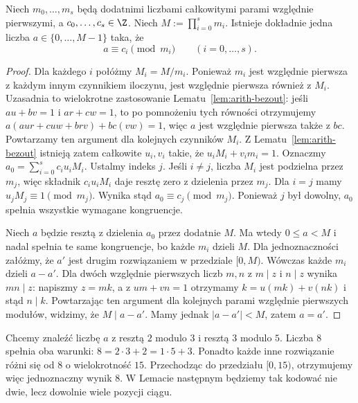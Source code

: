 \begin{twierdzenie}\label{thm:arith-crt}
Niech $m_0,\ldots,m_s$ będą dodatnimi liczbami całkowitymi
parami względnie pierwszymi, a $c_0,\ldots,c_s\in\Z$.
Niech $M:=\prod_{i=0}^s m_i$. Istnieje dokładnie jedna
liczba $a\in\{0,\ldots,M-1\}$ taka, że
\[
a\equiv c_i\pmod{m_i}\qquad(i=0,\ldots,s).
\]
\end{twierdzenie}
\begin{proof}
Dla każdego $i$ połóżmy $M_i=M/m_i$.
Ponieważ $m_i$ jest względnie pierwsza z każdym innym czynnikiem
iloczynu, jest względnie pierwsza również z $M_i$.
Uzasadnia to wielokrotne zastosowanie Lematu~\ref{lem:arith-bezout}:
jeśli $au+bv=1$ i $ar+cw=1$, to po pomnożeniu tych
równości otrzymujemy $a(aur+cuw+brv)+bc(vw)=1$,
więc $a$ jest względnie pierwsza także z $bc$.
Powtarzamy ten argument dla kolejnych czynników $M_i$.
Z Lematu~\ref{lem:arith-bezout} istnieją zatem całkowite
$u_i,v_i$ takie, że $u_iM_i+v_im_i=1$.
Oznaczmy $a_0=\sum_{i=0}^s c_i u_i M_i$.
Ustalmy indeks $j$. Jeśli $i\ne j$, liczba $M_i$ jest
podzielna przez $m_j$, więc składnik $c_i u_i M_i$ daje
resztę zero z dzielenia przez $m_j$. Dla $i=j$ mamy
$u_j M_j\equiv1\pmod{m_j}$. Wynika stąd
$a_0\equiv c_j\pmod{m_j}$. Ponieważ $j$ był dowolny,
$a_0$ spełnia wszystkie wymagane kongruencje.

Niech $a$ będzie resztą z dzielenia $a_0$ przez dodatnie $M$.
Ma wtedy $0\le a<M$ i nadal spełnia te same kongruencje,
bo każde $m_i$ dzieli $M$. Dla jednoznaczności załóżmy,
że $a'$ jest drugim rozwiązaniem w przedziale $[0,M)$.
Wówczas każde $m_i$ dzieli $a-a'$. Dla dwóch względnie pierwszych liczb $m,n$ z
$m\mid z$ i $n\mid z$ wynika $mn\mid z$:
napiszmy $z=mk$, a z $um+vn=1$ otrzymamy
$k=u(mk)+v(nk)$ i stąd $n\mid k$. Powtarzając ten
argument dla kolejnych parami względnie pierwszych
modułów, widzimy, że $M\mid a-a'$. Mamy jednak $|a-a'|<M$, zatem $a=a'$.
\end{proof}

\begin{przyklad}
Chcemy znaleźć liczbę $a$ z resztą $2$ modulo $3$ i
resztą $3$ modulo $5$. Liczba $8$ spełnia oba warunki:
$8=2\cdot3+2=1\cdot5+3$. Ponadto każde inne
rozwiązanie różni się od $8$ o wielokrotność $15$.
Przechodząc do przedziału $[0,15)$, otrzymujemy więc
jednoznaczny wynik $8$. W Lemacie następnym będziemy
tak kodować nie dwie, lecz dowolnie wiele pozycji ciągu.
\end{przyklad}

